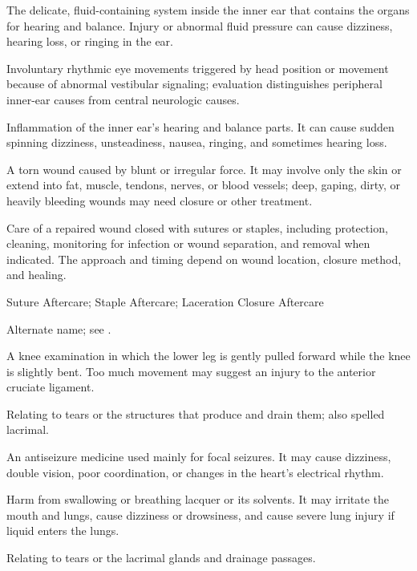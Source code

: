  The delicate, fluid-containing system inside the inner ear that contains the organs for hearing and balance. Injury or abnormal fluid pressure can cause dizziness, hearing loss, or ringing in the ear.

 Involuntary rhythmic eye movements triggered by head position or movement because of abnormal vestibular signaling; evaluation distinguishes peripheral inner-ear causes from central neurologic causes.

 Inflammation of the inner ear's hearing and balance parts. It can cause sudden spinning dizziness, unsteadiness, nausea, ringing, and sometimes hearing loss.

 A torn wound caused by blunt or irregular force. It may involve only the skin or extend into fat, muscle, tendons, nerves, or blood vessels; deep, gaping, dirty, or heavily bleeding wounds may need closure or other treatment.

 Care of a repaired wound closed with sutures or staples, including protection, cleaning, monitoring for infection or wound separation, and removal when indicated. The approach and timing depend on wound location, closure method, and healing.

\synonyms
Suture Aftercare; Staple Aftercare; Laceration Closure Aftercare

 Alternate name; see .

 A knee examination in which the lower leg is gently pulled forward while the knee is slightly bent. Too much movement may suggest an injury to the anterior cruciate ligament.

 Relating to tears or the structures that produce and drain them; also spelled lacrimal.

 An antiseizure medicine used mainly for focal seizures. It may cause dizziness, double vision, poor coordination, or changes in the heart's electrical rhythm.

 Harm from swallowing or breathing lacquer or its solvents. It may irritate the mouth and lungs, cause dizziness or drowsiness, and cause severe lung injury if liquid enters the lungs.

 Relating to tears or the lacrimal glands and drainage passages.

